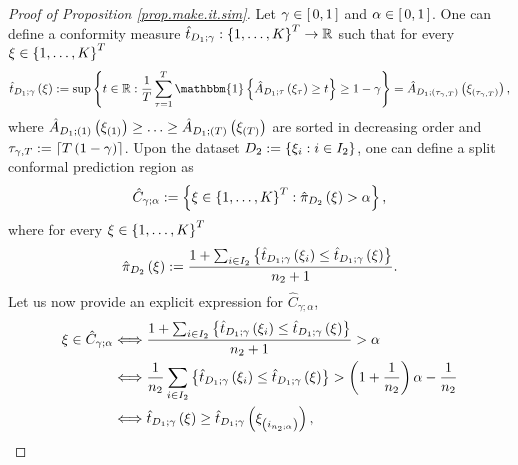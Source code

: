 \documentclass[11pt]{article}
\begin{document}
\begin{proof}[Proof of Proposition \ref{prop.make.it.sim}]
Let $\gamma \in \left[\, 0, 1 \,\right]$ and $\alpha \in \left[\, 0, 1 \,\right]$.
One can define a conformity measure $\hat{t}_{D_1; \gamma} : \left\{ 1, \ldots, K \right\}^{T} \to \mathbb{R}$ such that
for every $\xi \in \left\{ 1, \ldots, K \right\}^{T}$
\begin{align}
\label{eq.sim.conformity.score}    
    \hat{t}_{D_1; \gamma} \paren{\xi}
    := \sup
    \brac{
        t \in \mathbb{R}
        :
        \frac{1}{T}
        \sum_{\tau = 1}^{T}
        \mathbbm{1} \brac{
            \hat{A}_{D_1; \tau} \paren{\xi_{\tau}} \geq t
        }
        \geq 1 - \gamma
    }
    = \hat{A}_{D_1; \paren{\tau_{\gamma, T}}} \paren{\xi_{\paren{\tau_{\gamma, T}}}},
\end{align}
where $\hat{A}_{D_1; \left( 1 \right)} \left( \xi_{\left( 1 \right)} \right) \geq \ldots \geq \hat{A}_{D_1; \left( T \right)} \left( \xi_{\left( T \right)} \right)$
are sorted in decreasing order and $\tau_{\gamma, T} := \left\lceil T\left( 1 - \gamma \right) \right\rceil$.
%
%
%
Upon the dataset $D_2 := \left\{ \xi_{i} : i \in I_2 \right\}$,
one can define a split conformal prediction region as
\begin{align*}
    \hat{C}_{\gamma; \alpha}
    := \left\{ 
        \xi \in \left\{ 1, \ldots, K \right\}^{T} : \hat{\pi}_{D_2} \left( \xi \right) > \alpha
     \right\},
\end{align*}
where for every $\xi \in \left\{ 1, \ldots, K \right\}^{T}$
\begin{align*}
    \hat{\pi}_{D_2} \left( \xi \right)
    := \frac{
        1
        + \sum_{i \in I_2}
        \left\{ \hat{t}_{D_1; \gamma} \left( \xi_{i} \right) \leq \hat{t}_{D_1; \gamma} \left( \xi \right) \right\}
    }{n_2+1}.
\end{align*}
%
%
%
Let us now provide an explicit expression for $\hat{C}_{\gamma; \alpha}$,
\begin{align}
\label{eq.sim.cutoff}
    \xi \in \hat{C}_{\gamma; \alpha}
    &
    \Longleftrightarrow
    \frac{
        1
        + \sum_{i \in I_2}
        \left\{ \hat{t}_{D_1; \gamma} \left( \xi_{i} \right) \leq \hat{t}_{D_1; \gamma} \left( \xi \right) \right\}
    }{n_2+1} > \alpha
    \notag
    \\
    &
    \Longleftrightarrow
    \frac{1}{n_2}
    \sum_{i \in I_2}
    \left\{ \hat{t}_{D_1; \gamma} \left( \xi_{i} \right) \leq \hat{t}_{D_1; \gamma} \left( \xi \right) \right\}
    > \left( 1 + \frac{1}{n_2} \right)\alpha - \frac{1}{n_2}
    \notag
    \\
    &
    \Longleftrightarrow
    \hat{t}_{D_1; \gamma} \left( \xi \right)
    \geq \hat{t}_{D_1; \gamma} \left( \xi_{\left( i_{n_2; \alpha} \right)} \right),
\end{align}

\end{proof}
\end{document}
